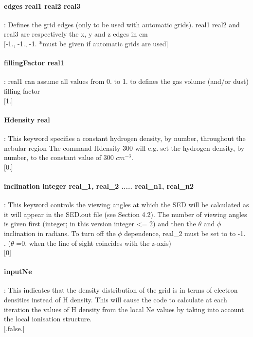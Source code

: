 \documentclass[11pt]{article}
\begin{document}
\paragraph    {edges real1 real2 real3 }: Defines the grid edges (only to be used with automatic
                     grids). real1 real2 and real3 are respectively the x, y and z 
                     edges in cm\\
                     $[$-1., -1., -1. *must be given if automatic grids are used$]$\\
		    

\paragraph    {fillingFactor real1} : real1 can assume all values from 0. to 1. to defines the gas 
                     volume (and/or dust) filling factor\\
                     $[$1.$]$\\

\paragraph    {Hdensity real }   : This keyword specifies a constant hydrogen density, 
		     by number, throughout the nebular region 
		     The command Hdensity 300 will e.g. set the 
		     hydrogen density, by number, to the constant value of 300 $cm^{-3}$.\\
		     $[$0.$]$\\

\paragraph    {inclination integer real\_1, real\_2 ..... real\_{n1}, real\_{n2}} : This keyword controls the
                     viewing angles at which the SED will be calculated as it will appear 
		     in the SED.out file (see Section 4.2). The number of viewing 
		     angles is given first (integer; in this version integer <= 2) and then the $\theta$
                     and $\phi$ inclination in radians. To turn off the $\phi$ dependence, real\_2 must be set to 
		     to -1. . 
		     ($\theta$ =0. when the line of sight coincides with the z-axis)\\
		     $[$0$]$\\

\paragraph    {inputNe  }        : This indicates that the density distribution of the grid is in 
                     terms of electron densities instead of H density. This will cause 
                     the code to calculate at each iteration the values of H density 
                     from the local Ne values by taking into account the local 
		     ionisation structure. \\
		     $[$.false.$]$\\
\end{document}
